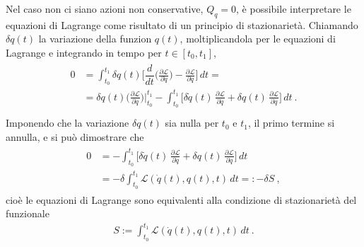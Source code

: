 \documentclass[letterpaper,10pt,english]{jupyterBook}
\begin{document}
\sphinxAtStartPar
Nel caso non ci siano azioni non conservative, \(Q_q = 0\), è possibile interpretare le equazioni di Lagrange come risultato di un principio di stazionarietà. Chiamando \(\delta q(t)\) la variazione della funzion \(q(t)\), moltiplicandola per le equazioni di Lagrange e integrando in tempo per \(t \in [t_0, t_1]\),
\begin{equation*}
\begin{split}\begin{aligned}
  0 & = \int_{t_0}^{t_1} \delta q (t) \Big[ \dfrac{d}{dt}\Big( \frac{\partial \mathscr{L}}{\partial \dot{q}} \Big) - \frac{\partial \mathscr{L}}{\partial q} \Big] \, dt = \\
    & = \delta q(t) \Big( \frac{\partial \mathscr{L}}{\partial \dot{q}} \Big) \Big|_{t_0}^{t_1} - \int_{t_0}^{t_1} \Big[ \delta \dot{q}(t) \, \frac{\partial \mathscr{L}}{\partial \dot{q}} + \delta q(t) \, \frac{\partial \mathscr{L}}{\partial q} \Big] \, dt \ . \\
\end{aligned}\end{split}
\end{equation*}
\sphinxAtStartPar
Imponendo che la variazione \(\delta q(t)\) sia nulla per \(t_0\) e \(t_1\), il primo termine si annulla, e si può dimostrare che
\begin{equation*}
\begin{split}\begin{aligned}
    0 & = - \int_{t_0}^{t_1} \Big[ \delta \dot{q}(t) \, \frac{\partial \mathscr{L}}{\partial \dot{q}} + \delta q(t) \, \frac{\partial \mathscr{L}}{\partial q} \Big] \, dt \\
    & = - \delta \int_{t_0}^{t_1} \mathscr{L}(\dot{q}(t), q(t), t) \, dt =: - \delta S \ ,
\end{aligned}\end{split}
\end{equation*}
\sphinxAtStartPar
cioè le equazioni di Lagrange sono equivalenti alla condizione di stazionarietà del funzionale 
\begin{equation*}
\begin{split}S:= \int_{t_0}^{t_1} \mathscr{L}(\dot{q}(t), q(t), t) \, dt \ .\end{split}
\end{equation*}
\sphinxstepscope
\end{document}
